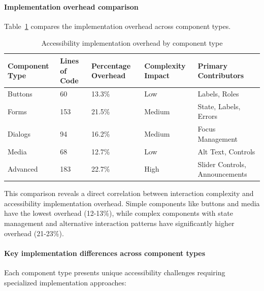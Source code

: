 \paragraph{Implementation overhead comparison}

Table~\ref{tab:comparative_overhead} compares the implementation overhead across component types.

\begin{table}[ht]
\caption{Accessibility implementation overhead by component type}
\label{tab:comparative_overhead}
\centering
\begin{tabular}{|p{2cm}|p{2.5cm}|p{2.5cm}|p{2.5cm}|p{2.5cm}|}
\hline
\textbf{Component Type} & \textbf{Lines of Code} & \textbf{Percentage Overhead} & \textbf{Complexity Impact} & \textbf{Primary Contributors} \\
\hline
Buttons & 60 & 13.3\% & Low & Labels, Roles \\
\hline
Forms & 153 & 21.5\% & Medium & State, Labels, Errors \\
\hline
Dialogs & 94 & 16.2\% & Medium & Focus Management \\
\hline
Media & 68 & 12.7\% & Low & Alt Text, Controls \\
\hline
Advanced & 183 & 22.7\% & High & Slider Controls, Announcements \\
\hline
\end{tabular}
\end{table}

This comparison reveals a direct correlation between interaction complexity and accessibility implementation overhead. Simple components like buttons and media have the lowest overhead (12-13\%), while complex components with state management and alternative interaction patterns have significantly higher overhead (21-23\%).

\paragraph{Key implementation differences across component types}

Each component type presents unique accessibility challenges requiring specialized implementation approaches:


